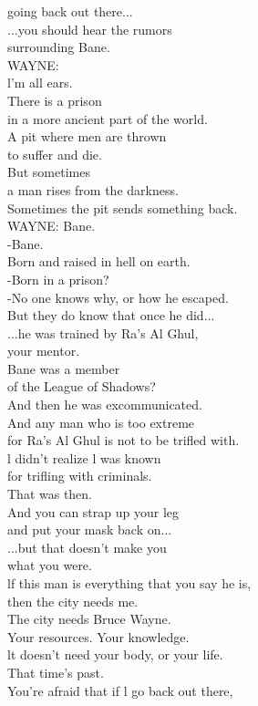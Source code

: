\documentclass{article}
\begin{document}
\begin{multicols}{3}
going back out there...\\
...you should hear the rumors\\
surrounding Bane.\\
WAYNE:\\
l'm all ears.\\
There is a prison\\
in a more ancient part of the world.\\
A pit where men are thrown\\
to suffer and die.\\
But sometimes\\
a man rises from the darkness.\\
Sometimes the pit sends something back.\\
WAYNE: Bane.\\
-Bane.\\
Born and raised in hell on earth.\\
-Born in a prison?\\
-No one knows why, or how he escaped.\\
But they do know that once he did...\\
...he was trained by Ra's Al Ghul,\\
your mentor.\\
Bane was a member\\
of the League of Shadows?\\
And then he was excommunicated.\\
And any man who is too extreme\\
for Ra's Al Ghul is not to be trifled with.\\
l didn't realize l was known\\
for trifling with criminals.\\
That was then.\\
And you can strap up your leg\\
and put your mask back on...\\
...but that doesn't make you\\
what you were.\\
lf this man is everything that you say he is,\\
then the city needs me.\\
The city needs Bruce Wayne.\\
Your resources. Your knowledge.\\
lt doesn't need your body, or your life.\\
That time's past.\\
You're afraid that if l go back out there,\\

\end{multicols}
\end{document}
